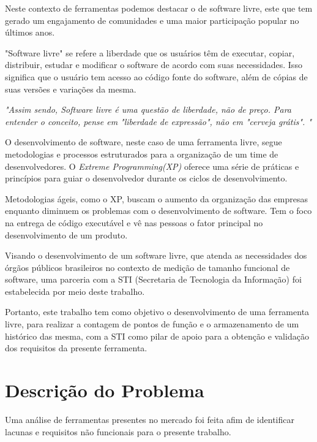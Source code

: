 Neste contexto de ferramentas podemos destacar o de software livre, este que tem gerado um engajamento de comunidades e uma maior participação popular no últimos anos. \cite{Eilola:2002} \nocite{Anota:2016}

"Software livre" se refere a liberdade que os usuários têm de executar, copiar, distribuir, estudar e modificar o software de acordo com suas necessidades. Isso significa que o usuário tem acesso ao código fonte do software, além de cópias de suas versões e variações da mesma. \cite{Stallman:2003}

\textit{"Assim sendo, Software livre é uma questão de liberdade, não de preço. Para entender o conceito, pense em "liberdade de expressão", não em "cerveja grátis". "} \cite{Stallman:2003}

O desenvolvimento de software, neste caso de uma ferramenta livre, segue metodologias e processos estruturados para a organização de um time de desenvolvedores. O \textit{Extreme Programming(XP)} oferece uma série de práticas e princípios para guiar o desenvolvedor durante os ciclos de desenvolvimento.

Metodologias ágeis, como o XP, buscam o aumento da organização das empresas enquanto diminuem os problemas com o desenvolvimento de software. Tem o foco na entrega de código executável e vê nas pessoas o fator principal no desenvolvimento de um produto. \cite{Maurer:2002}

Visando o desenvolvimento de um software livre, que atenda as necessidades dos órgãos públicos brasileiros no contexto de medição de tamanho funcional de software, uma parceria com a STI (Secretaria de Tecnologia da Informação) foi estabelecida por meio deste trabalho.

Portanto, este trabalho tem como objetivo o desenvolvimento de uma ferramenta livre, para realizar a contagem de pontos de função e o armazenamento de um histórico das mesma, com a STI como pilar de apoio para a obtenção e validação dos requisitos da presente ferramenta.

\section{Descrição do Problema}

Uma análise de ferramentas presentes no mercado foi feita afim de identificar lacunas e requisitos não funcionais para o presente trabalho.

